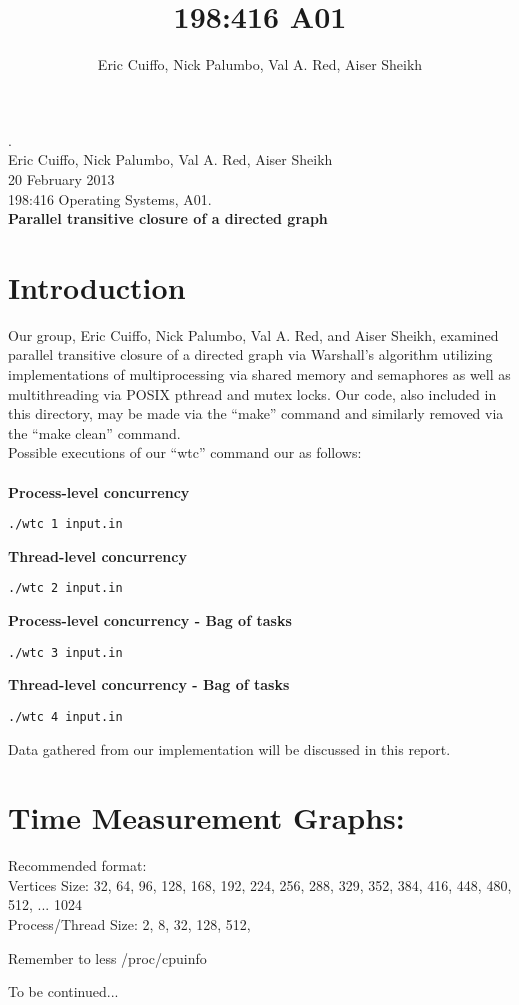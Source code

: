 \documentclass[10pt]{article}
\begin{document}
\title{198:416 A01}
\author{Eric Cuiffo, Nick Palumbo, Val A. Red, Aiser Sheikh}

\fancyhead{}
.\\
Eric Cuiffo, Nick Palumbo, Val A. Red, Aiser Sheikh\\
20 February 2013 \\
198:416 Operating Systems, A01. \\
{\bfseries Parallel transitive closure of a directed graph}

\section{Introduction}

Our group, Eric Cuiffo, Nick Palumbo, Val A. Red, and Aiser Sheikh, examined parallel transitive closure of a directed graph via Warshall’s algorithm utilizing implementations of multiprocessing via shared memory and semaphores as well as multithreading via POSIX pthread and mutex locks. Our code, also included in this directory, may be made via the ``make'' command and similarly removed via the ``make clean'' command. \\
\hspace*{36pt} Possible executions of our ``wtc'' command our as follows: \\ \\
{\bfseries Process-level concurrency} 
\begin{verbatim}
./wtc 1 input.in
\end{verbatim}
{\bfseries Thread-level concurrency} 
\begin{verbatim}
./wtc 2 input.in
\end{verbatim}
{\bfseries Process-level concurrency - Bag of tasks} 
\begin{verbatim}
./wtc 3 input.in
\end{verbatim}
{\bfseries Thread-level concurrency - Bag of tasks} 
\begin{verbatim}
./wtc 4 input.in
\end{verbatim}

Data gathered from our implementation will be discussed in this report.

\section{Time Measurement Graphs:}

Recommended format: \\
Vertices Size: 32, 64, 96, 128, 168, 192, 224, 256, 288, 329, 352, 384, 416, 448, 480, 512, ... 1024  \\
Process/Thread Size:
2, 
8,
32,
128,
512,

Remember to less /proc/cpuinfo

To be continued...
\end{document}
